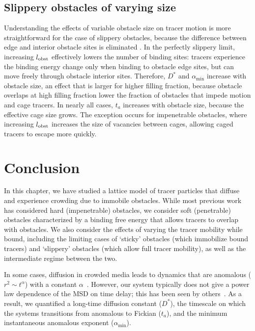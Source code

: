 \subsection{Slippery obstacles of varying size}

Understanding the effects of variable obstacle size on tracer motion is more
straightforward for the case of slippery obstacles, because the difference
between edge and interior obstacle sites is eliminated
. In the perfectly slippery limit, increasing $l_{\rm
  obst}$ effectively lowers the number of binding sites: tracers experience the
binding energy change only when binding to obstacle edge sites, but can move
freely through obstacle interior sites. Therefore, $D^*$ and $\alpha_{\min}$
increase with obstacle size, an effect that is larger for higher filling
fraction, because obstacle overlaps at high filling fraction lower the fraction
of obstacles that impede motion and cage tracers. In nearly all cases, $t_a$
increases with obstacle size, because the effective cage size grows. The
exception occurs for impenetrable obstacles, where increasing $l_{\rm obst}$
increases the size of vacancies between cages, allowing caged tracers to escape
more quickly.

\section{Conclusion}

In this chapter, we have studied a lattice model of tracer particles that
diffuse and experience crowding due to immobile obstacles. While most previous
work has considered hard (impenetrable) obstacles, we consider soft (penetrable)
obstacles characterized by a binding free energy that allows tracers to overlap
with obstacles. We also consider the effects of varying the tracer mobility
while bound, including the limiting cases of `sticky' obstacles (which
immobilize bound tracers) and `slippery' obstacles (which allow full tracer
mobility), as well as the intermediate regime between the two.

In some cases, diffusion in crowded media leads to dynamics that are anomalous
($r^2 \sim t^\alpha$) with a constant $\alpha$~\cite{hofling_anomalous_13}.
However, our system typically does not give a power law dependence of the MSD on
time delay; this has been seen by others~\cite{ellery_modeling_16,
  jeon_protein_16}.  As a result, we quantified a long-time diffusion constant
($D^*$), the timescale on which the systems transitions from anomalous to
Fickian ($t_a$), and the minimum instantaneous anomalous exponent
($\alpha_{\min}$).


